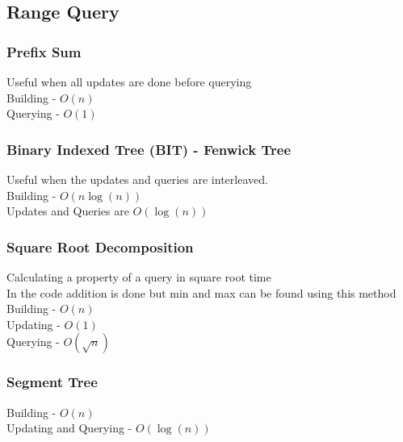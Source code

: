 \subsection{Range Query}

\subsubsection{Prefix Sum}
Useful when all updates are done before querying \\
Building - $O(n)$ \\
Querying - $O(1)$


\subsubsection{Binary Indexed Tree (BIT) - Fenwick Tree}
Useful when the updates and queries are interleaved. \\
Building - $O(n\log(n))$ \\
Updates and Queries are $O(\log(n))$


\clearpage

\subsubsection{Square Root Decomposition} \label{sqrt_decomposition}
Calculating a property of a query in square root time \\
In the code addition is done but min and max can be found using this method\\
Building - $O(n)$ \\
Updating - $O(1)$ \\
Querying - $O(\sqrt{n})$


\clearpage

\subsubsection{Segment Tree} \label{segment_tree}
Building - $O(n)$ \\
Updating and Querying - $O(\log(n))$



